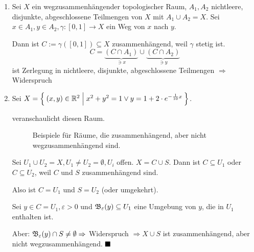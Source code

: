 \begin{beweis}\leavevmode
    \begin{enumerate}[label=\alph*)]
    \item Sei $X$ ein wegzusammenhängender topologischer Raum, $A_1, A_2$
    nichtleere, disjunkte, abgeschlossene Teilmengen von $X$ mit
    $A_1 \cup A_2 = X$. Sei $x \in A_1, y \in A_2, \gamma:[0,1] \rightarrow X$
    ein Weg von $x$ nach $y$.

    Dann ist $C:= \gamma([0,1]) \subseteq X$ zusammenhängend, weil 
    $\gamma$ stetig ist.
    \[C = \underbrace{(C \cap A_1)}_{\ni x} \cup \underbrace{(C \cap A_2)}_{\ni y}\]
    ist Zerlegung in nichtleere, disjunkte, abgeschlossene Teilmengen
    $\Rightarrow$ Widerspruch 

    \item Sei $X = \Set{(x,y) \in \ensuremath{\mathbb{R}}^2| x^2 + y^2 = 1 \lor y = 1 +2\cdot e^{-\frac{1}{10} x}}$.

         veranschaulicht diesen Raum.

        \begin{figure}[htp]
            \centering
            \subfloat[Sinus]{
                \resizebox{0.65\linewidth}{!}{}
                \label{fig:sinx}
            }%

            \caption{Beispiele für Räume, die zusammenhängend, aber nicht wegzusammenhängend sind.}
            \label{fig:zusammenhang-beispiele}
        \end{figure}

          Sei $U_1 \cup U_2 = X, U_1 \neq U_2 = \emptyset, U_i$ offen.
          $X = C \cup S$. Dann ist $C \subseteq U_1$ oder $C \subseteq U_2$,
          weil $C$ und $S$ zusammenhängend sind.

          Also ist $C = U_1$ und $S = U_2$ (oder umgekehrt).

          Sei $y \in C = U_1, \varepsilon > 0$ und $\mathfrak{B}_\varepsilon (y) \subseteq U_1$
          eine Umgebung von $y$, die in $U_1$ enthalten ist.

          Aber: $\mathfrak{B}_\varepsilon(y) \cap S \neq \emptyset \Rightarrow$
          Widerspruch $\Rightarrow X \cup S$ ist zusammenhängend, aber
          nicht wegzusammenhängend.
$\qed$
    \end{enumerate}
\end{beweis}

